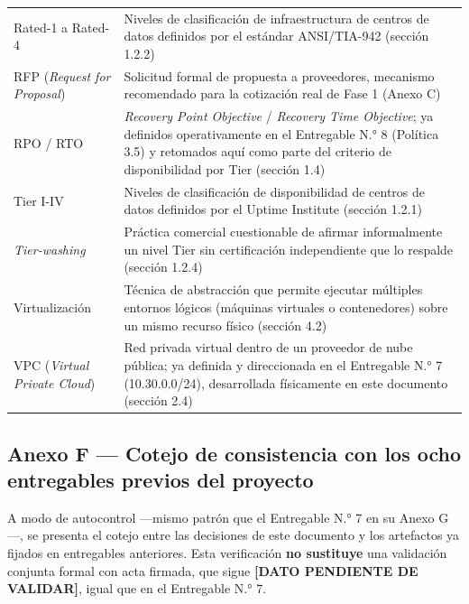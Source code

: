 \documentclass[11pt,a4paper]{article}
\begin{document}
{\begin{longtable}[]{@{}
  >{\raggedright\arraybackslash}p{}
  >{\raggedright\arraybackslash}p{}@{}}
Rated-1 a Rated-4 & Niveles de clasificación de infraestructura de centros de datos definidos por el estándar ANSI/TIA-942 (sección 1.2.2) \\
RFP (\emph{Request for Proposal}) & Solicitud formal de propuesta a proveedores, mecanismo recomendado para la cotización real de Fase 1 (Anexo C) \\
RPO / RTO & \emph{Recovery Point Objective} / \emph{Recovery Time Objective}; ya definidos operativamente en el Entregable N.° 8 (Política 3.5) y retomados aquí como parte del criterio de disponibilidad por Tier (sección 1.4) \\
Tier I-IV & Niveles de clasificación de disponibilidad de centros de datos definidos por el Uptime Institute (sección 1.2.1) \\
\emph{Tier-washing} & Práctica comercial cuestionable de afirmar informalmente un nivel Tier sin certificación independiente que lo respalde (sección 1.2.4) \\
Virtualización & Técnica de abstracción que permite ejecutar múltiples entornos lógicos (máquinas virtuales o contenedores) sobre un mismo recurso físico (sección 4.2) \\
VPC (\emph{Virtual Private Cloud}) & Red privada virtual dentro de un proveedor de nube pública; ya definida y direccionada en el Entregable N.° 7 (10.30.0.0/24), desarrollada físicamente en este documento (sección 2.4) \\
\end{longtable}
}

\subsection{Anexo F --- Cotejo de consistencia con los ocho entregables previos del proyecto}\label{anexo-f-cotejo-de-consistencia-con-los-ocho-entregables-previos-del-proyecto}

A modo de autocontrol ---mismo patrón que el Entregable N.° 7 en su Anexo G---, se presenta el cotejo entre las decisiones de este documento y los artefactos ya fijados en entregables anteriores. Esta verificación \textbf{no sustituye} una validación conjunta formal con acta firmada, que sigue \textbf{{[}DATO PENDIENTE DE VALIDAR{]}}, igual que en el Entregable N.° 7.
\end{document}
